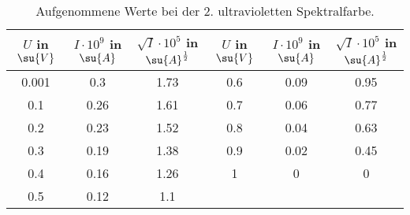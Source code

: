 \begin{table}
  \centering
  \label{tab:UV2}
  \caption{Aufgenommene Werte bei der 2. ultravioletten Spektralfarbe.}
  \begin{tabular}{c c c | c c c}
    \toprule
    $U$ in $\su{V}$ & $I\cdot 10^{9}$ in $\su{A}$ & $\sqrt{I}\cdot10^{5}$ in $\su{A}^{\frac{1}{2}}$ &
    $U$ in $\su{V}$ & $I\cdot 10^{9}$ in $\su{A}$ & $\sqrt{I}\cdot10^{5}$ in $\su{A}^{\frac{1}{2}}$ \\
    \midrule
    0.001 & 0.3  & 1.73 & 0.6   & 0.09 & 0.95 \\
    0.1   & 0.26 & 1.61 & 0.7   & 0.06 & 0.77 \\
    0.2   & 0.23 & 1.52 & 0.8   & 0.04 & 0.63 \\
    0.3   & 0.19 & 1.38 & 0.9   & 0.02 & 0.45 \\
    0.4   & 0.16 & 1.26 & 1     & 0    & 0    \\
    0.5   & 0.12 & 1.1  &      &      &      \\
    \bottomrule
  \end{tabular}
\end{table}
